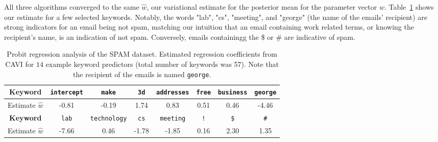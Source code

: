 \documentclass{article}
\begin{document}
All three algorithms converged to the same $\hat w$, our variational estimate for the posterior mean for the parameter vector $w$.  Table~\ref{table:Spam_table} shows our estimate for a few selected keywords. Notably, the words "lab", "cs", "meeting", and "george" (the name of the emails' recipient) are strong indicators for an email being not spam, matching our intuition that an email containing work related terms, or knowing the recipient's name, is an indication of not spam. Conversely, emails containingg the \$ or \# are indicative of spam. 


\begin{table}[tb]
\begin{tabular}{c | c | c | c | c | c | c | c}
\toprule
\toprule
\textbf{Keyword} & \texttt{intercept} & \texttt{make} & \texttt{3d} & \texttt{addresses} & \texttt{free} & \texttt{business} & \texttt{george} \\
\midrule
Estimate $\widehat w$ & -0.81 & -0.19 & 1.74 & 0.83 & 0.51 & 0.46 & -4.46\\
\midrule
\textbf{Keyword} & \texttt{lab} & \texttt{technology} & \texttt{cs} & \texttt{meeting} & \texttt{!} & \texttt{\$} & \texttt{\#} \\
\midrule
Estimate $\widehat w$ & -7.66 & 0.46 & -1.78 & -1.85 & 0.16 & 2.30 & 1.35\\
\bottomrule
\bottomrule
\end{tabular}
\vspace{0.5em}

\caption{Probit regression analysis of the SPAM dataset. Estimated regression coefficients from CAVI for $14$ example keyword predictors (total number of keywords was 57). Note that the recipient of the emails is named \texttt{george}.}
\label{table:Spam_table}
\end{table}
\end{document}
